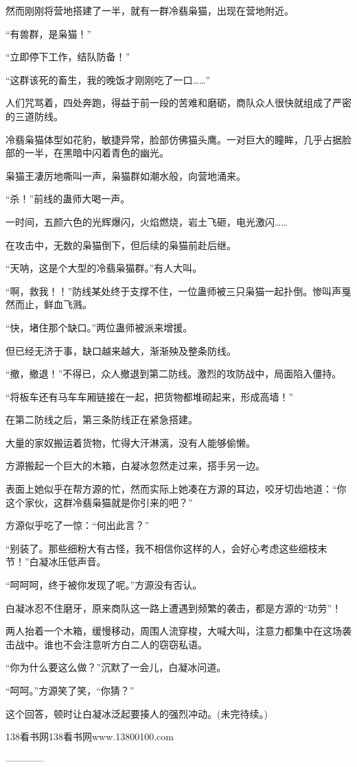 \begin{this_body}
然而刚刚将营地搭建了一半，就有一群冷翡枭猫，出现在营地附近。

“有兽群，是枭猫！”

“立即停下工作，结队防备！”

“这群该死的畜生，我的晚饭才刚刚吃了一口……”

人们咒骂着，四处奔跑，得益于前一段的苦难和磨砺，商队众人很快就组成了严密的三道防线。

冷翡枭猫体型如花豹，敏捷异常，脸部仿佛猫头鹰。一对巨大的瞳眸，几乎占据脸部的一半，在黑暗中闪着青色的幽光。

枭猫王凄厉地嘶叫一声，枭猫群如潮水般，向营地涌来。

“杀！”前线的蛊师大喝一声。

一时间，五颜六色的光辉爆闪，火焰燃烧，岩土飞砸，电光激闪……

在攻击中，无数的枭猫倒下，但后续的枭猫前赴后继。

“天呐，这是个大型的冷翡枭猫群。”有人大叫。

“啊，救我！！”防线某处终于支撑不住，一位蛊师被三只枭猫一起扑倒。惨叫声戛然而止，鲜血飞溅。

“快，堵住那个缺口。”两位蛊师被派来增援。

但已经无济于事，缺口越来越大，渐渐殃及整条防线。

“撤，撤退！”不得已，众人撤退到第二防线。激烈的攻防战中，局面陷入僵持。

“将板车还有马车车厢链接在一起，把货物都堆砌起来，形成高墙！”

在第二防线之后，第三条防线正在紧急搭建。

大量的家奴搬运着货物，忙得大汗淋漓，没有人能够偷懒。

方源搬起一个巨大的木箱，白凝冰忽然走过来，搭手另一边。

表面上她似乎在帮方源的忙，然而实际上她凑在方源的耳边，咬牙切齿地道：“你这个家伙，这群冷翡枭猫就是你引来的吧？”

方源似乎吃了一惊：“何出此言？”

“别装了。那些细粉大有古怪，我不相信你这样的人，会好心考虑这些细枝末节！”白凝冰压低声音。

“呵呵呵，终于被你发现了呢。”方源没有否认。

白凝冰忍不住磨牙，原来商队这一路上遭遇到频繁的袭击，都是方源的“功劳”！

两人抬着一个木箱，缓慢移动，周围人流穿梭，大喊大叫，注意力都集中在这场袭击战中。谁也不会注意听方白二人的窃窃私语。

“你为什么要这么做？”沉默了一会儿，白凝冰问道。

“呵呵。”方源笑了笑，“你猜？”

这个回答，顿时让白凝冰泛起要揍人的强烈冲动。(未完待续。)

138看书网138看书网www.13800100.com

------------

\end{this_body}

